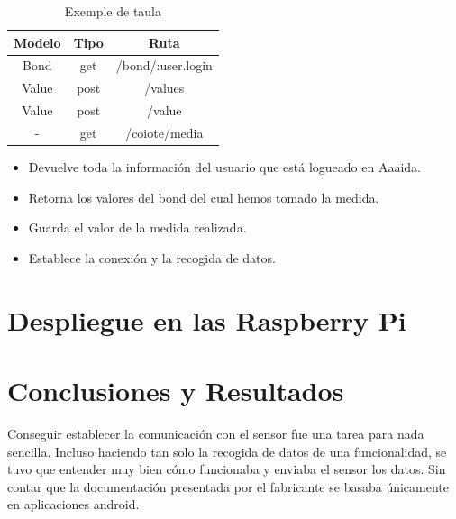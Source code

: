 \begin{table}[htb]

\begin{center}

\begin{tabular}{|c|c|c|}

\hline

{\bf Modelo} & {\bf Tipo} &

{\bf Ruta} \\ \hline \hline

Bond & get & /bond/:user.login  \\ \hline

Value & post & /values \\ \hline

Value & post & /value \\ \hline

- & get & /coiote/media \\ \hline

\end{tabular}

\caption{Exemple de taula}

\label{T:prova}

\end{center}

\end{table}

\begin{itemize}
\item Devuelve toda la información del usuario que está logueado en Aaaida.
\item Retorna los valores del bond del cual hemos tomado la medida.
\item Guarda el valor de la medida realizada. 
\item Establece la conexión y la recogida de datos.
\end{itemize}

\section{Despliegue en las Raspberry Pi}


\section{Conclusiones y Resultados}

Conseguir establecer la comunicación con el sensor fue una tarea para nada sencilla. Incluso haciendo tan solo la recogida de datos de una funcionalidad, se tuvo que entender muy bien cómo funcionaba y enviaba el sensor los datos. Sin contar que la documentación presentada por el fabricante se basaba únicamente en aplicaciones android. 

